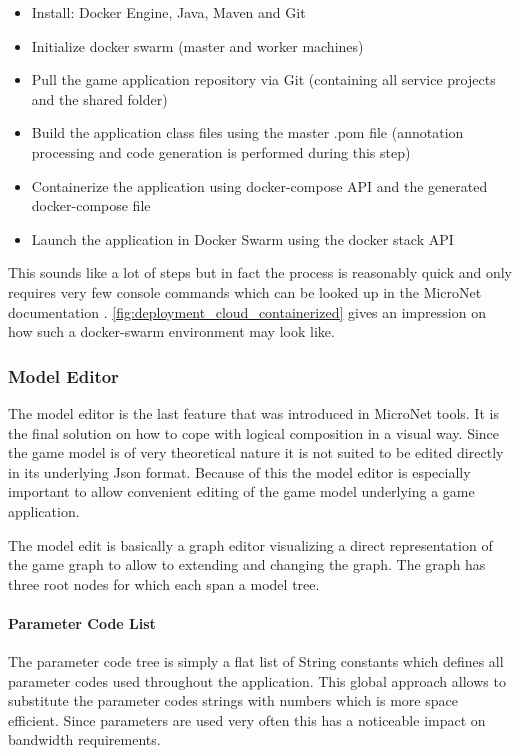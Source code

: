 \begin{itemize}
  \item Install: Docker Engine, Java, Maven and Git
  \item Initialize docker swarm (master and worker machines)
  \item Pull the game application repository via Git (containing all service
  projects and the shared folder)
  \item Build the application class files using the master .pom file (annotation
  processing and code generation is performed during this step)
  \item Containerize the application using docker-compose API and the generated
  docker-compose file
  \item Launch the application in Docker Swarm using the docker stack API 
\end{itemize}

This sounds like a lot of steps but in fact the process is reasonably quick and
only requires very few console commands which can be looked up in the MicroNet
documentation \cite{micronet2017doku}.
\autoref{fig:deployment_cloud_containerized} gives an impression on how such a
docker-swarm environment may look like.

\subsubsection{Model Editor}

The model editor is the last feature that was introduced in MicroNet tools. It
is the final solution on how to cope with logical \ms{} composition in a visual
way. Since the game model is of very theoretical nature it is not suited to be
edited directly in its underlying Json format. Because of this the model editor
is especially important to allow convenient editing of the game model underlying
a game application.

The model edit is basically a graph editor visualizing a direct representation
of the game graph to allow to extending and changing the graph. The graph has
three root nodes for which each span a model tree.

\paragraph{Parameter Code List}

The parameter code tree is simply a flat list of String constants which defines
all parameter codes used throughout the application. This global approach allows
to substitute the parameter codes strings with numbers which is more space
efficient. Since parameters are used very often this has a noticeable impact on
bandwidth requirements.

